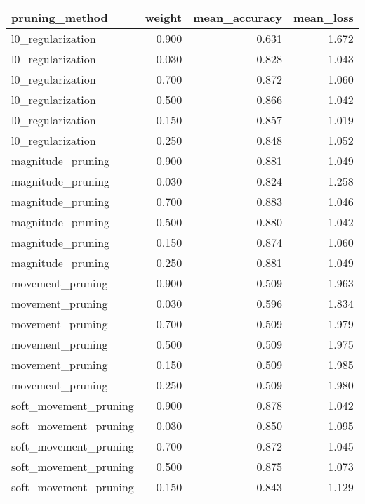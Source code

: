 \begin{tabular}{lrrr}
\toprule
       pruning\_method &  weight &  mean\_accuracy &  mean\_loss \\
\midrule
    l0\_regularization &   0.900 &          0.631 &      1.672 \\
    l0\_regularization &   0.030 &          0.828 &      1.043 \\
    l0\_regularization &   0.700 &          0.872 &      1.060 \\
    l0\_regularization &   0.500 &          0.866 &      1.042 \\
    l0\_regularization &   0.150 &          0.857 &      1.019 \\
    l0\_regularization &   0.250 &          0.848 &      1.052 \\
    magnitude\_pruning &   0.900 &          0.881 &      1.049 \\
    magnitude\_pruning &   0.030 &          0.824 &      1.258 \\
    magnitude\_pruning &   0.700 &          0.883 &      1.046 \\
    magnitude\_pruning &   0.500 &          0.880 &      1.042 \\
    magnitude\_pruning &   0.150 &          0.874 &      1.060 \\
    magnitude\_pruning &   0.250 &          0.881 &      1.049 \\
     movement\_pruning &   0.900 &          0.509 &      1.963 \\
     movement\_pruning &   0.030 &          0.596 &      1.834 \\
     movement\_pruning &   0.700 &          0.509 &      1.979 \\
     movement\_pruning &   0.500 &          0.509 &      1.975 \\
     movement\_pruning &   0.150 &          0.509 &      1.985 \\
     movement\_pruning &   0.250 &          0.509 &      1.980 \\
soft\_movement\_pruning &   0.900 &          0.878 &      1.042 \\
soft\_movement\_pruning &   0.030 &          0.850 &      1.095 \\
soft\_movement\_pruning &   0.700 &          0.872 &      1.045 \\
soft\_movement\_pruning &   0.500 &          0.875 &      1.073 \\
soft\_movement\_pruning &   0.150 &          0.843 &      1.129 \\

\end{tabular}
